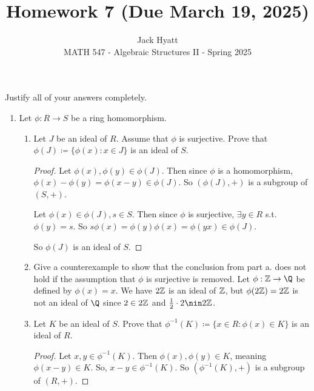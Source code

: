 \documentclass[12pt]{article}
\begin{document}
	
	
	
	\title{Homework 7 (Due March 19, 2025)}
	\author{Jack Hyatt\\ %
		MATH 547 - Algebraic Structures II - Spring 2025} 
	
	\maketitle
	
	Justify all of your answers completely.\\
	
	
	\medskip 
	
	\begin{enumerate}
		\item Let $\phi : R \rightarrow S$ be a ring homomorphism.
		\begin{enumerate}
			\item Let $J$ be an ideal of $R$. Assume that $\phi$ is surjective. Prove that $\phi(J) \coloneq \{\phi(x) : x \in J\}$ is an ideal of $S$.
			\begin{proof}
				Let $\phi(x),\phi(y) \in \phi(J)$. Then since $\phi$ is a homomorphism, $\phi(x) - \phi(y) = \phi(x-y) \in \phi(J)$. So $(\phi(J), +)$ is a subgroup of $(S,+)$.
				
				Let $\phi(x) \in \phi(J), s \in S$. Then since $\phi$ is surjective, $\exists y \in R$ s.t. $\phi(y) = s$. So $s\phi(x) = \phi(y)\phi(x) = \phi(yx) \in \phi(J)$.
				
				So $\phi(J)$ is an ideal of $S$.
			\end{proof}
			
			\item Give a counterexample to show that the conclusion from part a. does not hold if the assumption that $\phi$ is surjective is removed.\m
			Let $\phi : \Z \rightarrow \Q$ be defined by $\phi(x) = x$. We have $2\mathbb{Z}$ is an ideal of $\mathbb{Z}$, but $\phi(2\mathbb{Z}) = 2\mathbb{Z}$ is not an ideal of $\Q$ since $2 \in 2\mathbb{Z}$ and $\frac{1}{2}\cdot2 \nin 2\Z$.
			
			\item Let $K$ be an ideal of $S$. Prove that $\phi^{-1}(K) \coloneq \{x \in R : \phi(x) \in K\}$ is an ideal of $R$.
			\begin{proof}
				Let $x,y \in \phi^{-1}(K)$. Then $\phi(x),\phi(y) \in K$, meaning $\phi(x-y) \in K$. So, $x - y \in \phi^{-1}(K)$. So $(\phi^{-1}(K), +)$ is a subgroup of $(R,+)$.
				

\end{proof}
\end{enumerate}
\end{enumerate}
\end{document}

